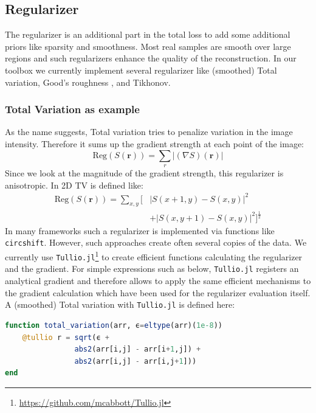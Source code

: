 \documentclass{juliacon}
\begin{document}
\subsection{Regularizer}
    The regularizer is an additional part in the total loss to add some additional priors like sparsity and smoothness.
    Most real samples are smooth over large regions and such regularizers enhance the quality of the reconstruction.
    In our toolbox we currently implement several regularizer like (smoothed) Total variation, Good's roughness \cite{Verveer:98}, \cite{Good:71} and Tikhonov. 
    \subsubsection{Total Variation as example}
        As the name suggests, Total variation tries to penalize variation in the image intensity. Therefore it sums up the gradient strength at each point
        of the image:
        \begin{equation}
            \text{Reg}(S(\mathbf r)) = \sum_r  |(\nabla S)(\mathbf r)|
        \end{equation}
        Since we look at the magnitude of the gradient strength, this regularizer is anisotropic.
        In 2D TV is defined like: 
        \begin{equation}
        \begin{split}
            \text{Reg}(S(\mathbf r)) = \sum_{x,y} \big[& |S(x + 1, y) - S(x, y)|^2 \\ 
                                                & + |S(x, y + 1) - S(x, y)|^2\big]^{\frac12}
        \end{split}
        \end{equation}
        In many frameworks such a regularizer is implemented via functions like \lstinline{circshift}. 
        However, such approaches create often several copies of the data. 
        We currently use \verb|Tullio.jl|\footnote{\url{https://github.com/mcabbott/Tullio.jl}} to create efficient functions 
        calculating the regularizer and the gradient. For simple expressions
        such as below, \verb|Tullio.jl| registers an analytical gradient and therefore allows to apply the same efficient mechanisms 
        to the gradient calculation which have been used for the regularizer evaluation itself.
        A (smoothed) Total variation with \verb|Tullio.jl| is defined here:
        \begin{lstlisting}[language = Julia]
function total_variation(arr, ϵ=eltype(arr)(1e-8))
    @tullio r = sqrt(ϵ + 
                abs2(arr[i,j] - arr[i+1,j]) +
                abs2(arr[i,j] - arr[i,j+1]))
end
        \end{lstlisting}
\end{document}
